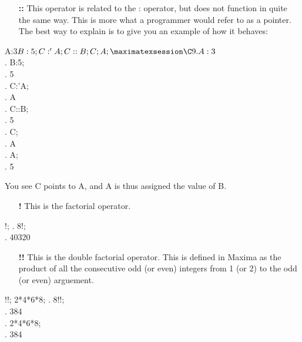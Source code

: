 \begin{enumerate}
\item [\bf{::}] This operator is related to the : operator, but does 
not function in quite the same way.  This is more what a programmer 
would refer to as a pointer.  The best way to explain is to give you 
an example of how it behaves:
\end{enumerate}

\vspace{3ex}

\beginmaximasession
A:3$
B:5;
C:'A;
C::B;
C;
A;
\maximatexsession
\C9.  A:3$ \\
.  B:5; \\
.   5 \\
.  C:'A; \\
.   A \\
.  C::B; \\
.   5 \\
.  C; \\
.   A \\
.  A; \\
.   5 \\
\endmaximasession

\vspace{3ex}

You see C points to A, and A is thus assigned the value of B.

\begin{enumerate}
\item [\bf{!}] This is the factorial operator.
\end{enumerate}

\vspace{3ex}

!;
\maximatexsession
{}.  8!; \\
.   40320 \\
\endmaximasession

\vspace{3ex}

\begin{enumerate}
\item [\bf{!!}] This is the double factorial operator.  This is 
defined in Maxima as the product of all the consecutive odd
(or even) integers from 1 (or 2) to the odd (or even) arguement.
\end{enumerate}

\vspace{3ex}

!!;
2*4*6*8;
\maximatexsession
{}.  8!!; \\
.   384 \\
.  2*4*6*8; \\
.   384 \\
\endmaximasession

